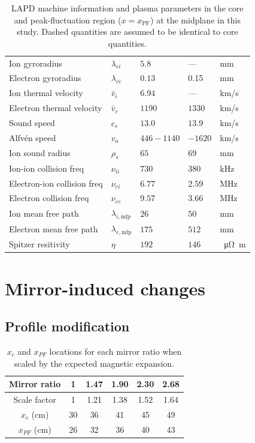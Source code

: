 \begin{table}
\begin{tabular}{l l l l l}
        Ion gyroradius & $\lambda_{ci}$ & $5.8$ & — & mm \\
        Electron gyroradius & $\lambda_{ce}$ & $0.13$ & 0.15 & mm \\
        Ion thermal velocity & $\bar{v}_i$ & $6.94$ & — & km/s\\
        Electron thermal velocity & $\bar{v}_{e}$ & $1190$ & $1330$ & km/s \\
        Sound speed & $c_s$ & $13.0$ & $13.9$ & km/s\\
        Alfvén speed & $v_a$ & $446 - 1140$ & $ - 1620$ & km/s \\
        Ion sound radius & $\rho_s$ & $65$ & $69$ & mm\\
        Ion-ion collision freq & $\nu_{ii}$ & $730$ & $380$ & kHz \\
        Electron-ion collision freq & $\nu_{ei}$ & $6.77$ & $2.59$ & MHz \\
        Electron collision freq & $\nu_{ee}$ & $9.57$ & $3.66$ & MHz \\
        Ion mean free path & $\lambda_{i,\text{mfp}}$ & $26$ & $50$ & mm \\
        Electron mean free path & $\lambda_{e, \text{mfp}}$ & $175$ & $512$ & mm \\
        Spitzer resitivity &  $\eta$ & $192$ & $146$ & \SI{}{\micro \ohm \meter} \\
        
    \end{tabular}
    \caption[LAPD plasma parameters]{LAPD machine information and plasma parameters in the core and peak-fluctuation region ($x=x_\text{PF}$) at the midplane in this study. Dashed quantities are assumed to be identical to core quantities.}
    \label{tab:plasma-parameters}
\end{table}

\section{\label{sec:changes}Mirror-induced changes}

\subsection{Profile modification}

\begin{table}
    \centering
    \begin{tabular}{c c c c c c}
         Mirror ratio & 1 & 1.47 & 1.90 & 2.30 & 2.68 \\
         \hline
         Scale factor & 1 & 1.21 & 1.38 & 1.52 & 1.64\\
         $x_{c}$ (cm) & 30 & 36 & 41 & 45 & 49 \\
         $x_{PF}$ (cm) & 26 & 32 & 36 & 40 & 43 \\
    \end{tabular}
    \caption[$x_c$ and $x_{PF}$ locations for each mirror ratio]{$x_c$ and $x_{PF}$ locations for each mirror ratio when scaled by the expected magnetic expansion.}
    \label{tab:x_PF}
\end{table}

